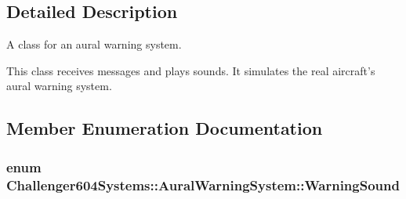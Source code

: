 \subsection{Detailed Description}
A class for an aural warning system. 

This class receives messages and plays sounds. It simulates the real aircraft's aural warning system. 

\subsection{Member Enumeration Documentation}
\hypertarget{class_challenger604_systems_1_1_aural_warning_system_a06a8a8fa973dde5ad449b8e0ca058a26}{
\subsubsection[{Warning\-Sound}]{\setlength{\rightskip}{0pt plus 5cm}enum {\bf Challenger604\-Systems\-::\-Aural\-Warning\-System\-::\-Warning\-Sound}}}\label{class_challenger604_systems_1_1_aural_warning_system_a06a8a8fa973dde5ad449b8e0ca058a26}
